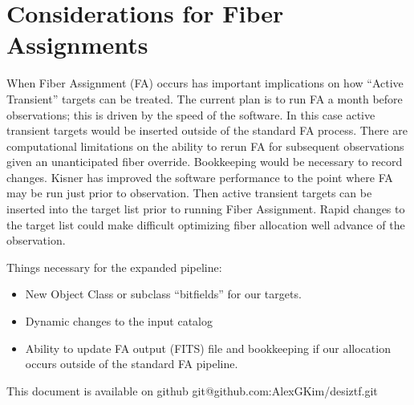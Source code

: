 \documentclass[11pt, oneside]{article}   	%
\begin{document}
\section{Considerations for Fiber Assignments}
When Fiber Assignment (FA) occurs has important implications on how ``Active Transient'' targets can be treated.
The current plan is to run FA a month before observations; this is driven by the speed of the software.   In this case active transient targets
would be inserted outside of the standard FA process.  There are computational limitations on the ability to rerun FA for subsequent observations
given an unanticipated fiber override.  Bookkeeping would be necessary to record changes.
Kisner has improved the software performance to the point where FA may be run just prior to observation.  Then active transient targets can be inserted into
the target list prior to running Fiber Assignment.  Rapid changes to the target list could make difficult optimizing fiber allocation well advance of
the observation.

Things necessary for the expanded pipeline:
\begin{itemize}
\item New  Object Class or subclass ``bitfields'' for our targets.
\item Dynamic changes to the input catalog
\item  Ability to update FA output (FITS) file and bookkeeping if our allocation occurs outside of the standard FA pipeline.
\end{itemize}

This document is available on github git@github.com:AlexGKim/desiztf.git
\end{document}

